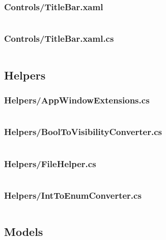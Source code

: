 \documentclass[a4paper]{report}
\begin{document}
\inputminted{csharp}{"../src/Algorithm Dynamics/Controls/CodeEditor.xaml.cs"}

\subsubsection{Controls/TitleBar.xaml}

\inputminted{xml}{"../src/Algorithm Dynamics/Controls/TitleBar.xaml"}

\subsubsection{Controls/TitleBar.xaml.cs}

\inputminted{csharp}{"../src/Algorithm Dynamics/Controls/TitleBar.xaml.cs"}

\subsection{Helpers}

\subsubsection{Helpers/AppWindowExtensions.cs}

\inputminted{csharp}{"../src/Algorithm Dynamics/Helpers/AppWindowExtensions.cs"}

\subsubsection{Helpers/BoolToVisibilityConverter.cs}

\inputminted{csharp}{"../src/Algorithm Dynamics/Helpers/BoolToVisibilityConverter.cs"}

\subsubsection{Helpers/FileHelper.cs}

\inputminted{csharp}{"../src/Algorithm Dynamics/Helpers/FileHelper.cs"}

\subsubsection{Helpers/IntToEnumConverter.cs}

\inputminted{csharp}{"../src/Algorithm Dynamics/Helpers/IntToEnumConverter.cs"}

\subsection{Models}
\end{document}
